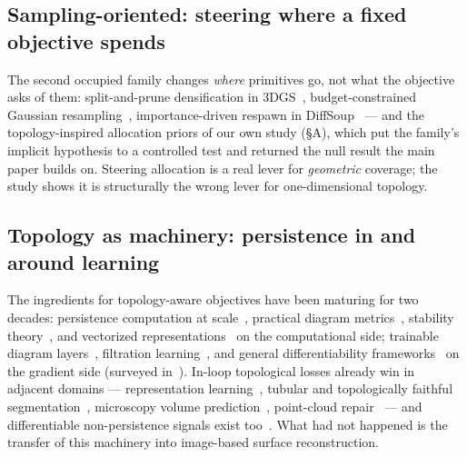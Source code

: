 \subsection{Sampling-oriented: steering where a fixed objective spends}
The second occupied family changes \emph{where} primitives go, not what
the objective asks of them: split-and-prune densification in
3DGS~\citep{kerbl2023gaussians}, budget-constrained Gaussian
resampling~\citep{fang2024minisplatting}, importance-driven respawn in
DiffSoup~\citep{tojo2026diffsoup} --- and the topology-inspired
allocation priors of our own study (\S A), which put the family's
implicit hypothesis to a controlled test and returned the null result
the main paper builds on. Steering allocation is a real lever for
\emph{geometric} coverage; the study shows it is structurally the wrong
lever for one-dimensional topology.

\subsection{Topology as machinery: persistence in and around learning}
The ingredients for topology-aware objectives have been maturing for two
decades: persistence computation at
scale~\citep{zomorodian2005computing,bauer2021ripser,maria2014gudhi},
practical diagram metrics~\citep{kerber2017geometry}, stability
theory~\citep{cohensteiner2007stability}, and vectorized
representations~\citep{adams2017images,bubenik2015landscapes} on the
computational side; trainable diagram
layers~\citep{hofer2017signatures,carriere2020perslay}, filtration
learning~\citep{hofer2020filtration}, and general differentiability
frameworks~\citep{leygonie2022framework,carriere2021optimizing,nigmetov2024bigsteps}
on the gradient side (surveyed
in~\citep{chazal2021introduction,carriere2026survey}). In-loop
topological losses already win in adjacent domains --- representation
learning~\citep{moor2020topoae}, tubular and topologically faithful
segmentation~\citep{shit2021cldice,stucki2023betti,hu2019topopreserving,clough2022topoloss},
microscopy volume prediction~\citep{waibel2022topological}, point-cloud
repair~\citep{bruel2020toporecon,poulenard2018shapematching} --- and
differentiable non-persistence signals exist
too~\citep{roell2024dect}. What had not happened is the transfer of
this machinery into image-based surface reconstruction.

